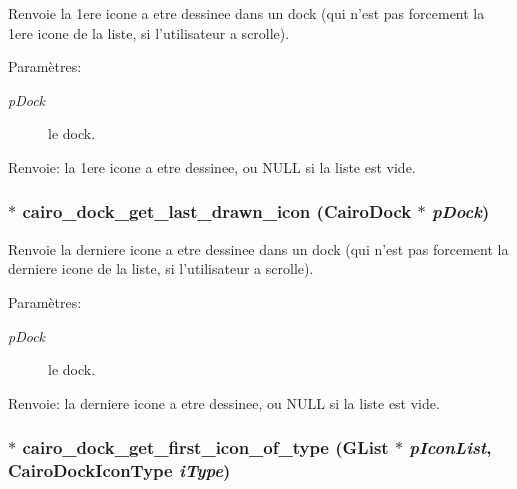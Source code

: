 Renvoie la 1ere icone a etre dessinee dans un dock (qui n'est pas forcement la 1ere icone de la liste, si l'utilisateur a scrolle). \begin{Desc}
\item[Paramètres:]
\begin{description}
\item[{\em pDock}]le dock. \end{description}
\end{Desc}
\begin{Desc}
\item[Renvoie:]la 1ere icone a etre dessinee, ou NULL si la liste est vide. \end{Desc}
\subsubsection{$\ast$ cairo\_\-dock\_\-get\_\-last\_\-drawn\_\-icon ({\bf CairoDock} $\ast$ {\em pDock})}\label{cairo-dock-icons_8h_1b554df6ac772507962a71409d457ea5}


Renvoie la derniere icone a etre dessinee dans un dock (qui n'est pas forcement la derniere icone de la liste, si l'utilisateur a scrolle). \begin{Desc}
\item[Paramètres:]
\begin{description}
\item[{\em pDock}]le dock. \end{description}
\end{Desc}
\begin{Desc}
\item[Renvoie:]la derniere icone a etre dessinee, ou NULL si la liste est vide. \end{Desc}
\subsubsection{$\ast$ cairo\_\-dock\_\-get\_\-first\_\-icon\_\-of\_\-type (GList $\ast$ {\em pIconList}, {\bf CairoDockIconType} {\em iType})}\label{cairo-dock-icons_8h_9a7036812e508856128697b1c8b39c32}


